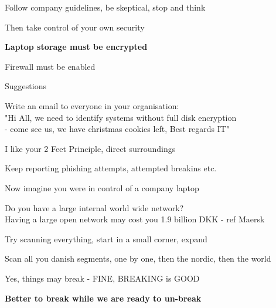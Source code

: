 \documentclass[Screen16to9,17pt,footrule]{foils}
\begin{document}
\begin{list1}
\item Follow company guidelines, be skeptical, stop and think
\item Then take control of your own security
\item {\bf Laptop storage must be encrypted}
\item Firewall must be enabled
\item Suggestions
\begin{list2}
\item Write an email to everyone in your organisation:\\
"Hi All, we need to identify systems without full disk encryption \\
- come see us, we have christmas cookies left, Best regards IT"
\end{list2}
\vskip 5mm
\item I like your 2 Feet Principle, direct surroundings
\item Keep reporting phishing attempts, attempted breakins etc.
\end{list1}





\begin{list2}
\item Now imagine you were in control of a company laptop
\item Do you have a large internal world wide network?\\
Having a large open network may cost you 1.9 billion DKK - ref Maersk
\item Try scanning everything, start in a small corner, expand
\item Scan all you danish segments, one by one, then the nordic, then the world
\item Yes, things may break - FINE, BREAKING is GOOD
\end{list2}

\centerline{\bf Better to break while we are ready to un-break}


\myquestionspage
\end{document}
